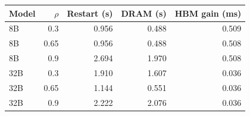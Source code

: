 \begin{tabular}{lrrrr}
\toprule
Model & $\rho$ & Restart (s) & DRAM (s) & HBM gain (ms) \\
\midrule
8B & 0.3 & 0.956 & 0.488 & 0.509 \\
8B & 0.65 & 0.956 & 0.488 & 0.508 \\
8B & 0.9 & 2.694 & 1.970 & 0.508 \\
32B & 0.3 & 1.910 & 1.607 & 0.036 \\
32B & 0.65 & 1.144 & 0.551 & 0.036 \\
32B & 0.9 & 2.222 & 2.076 & 0.036 \\
\bottomrule
\end{tabular}
